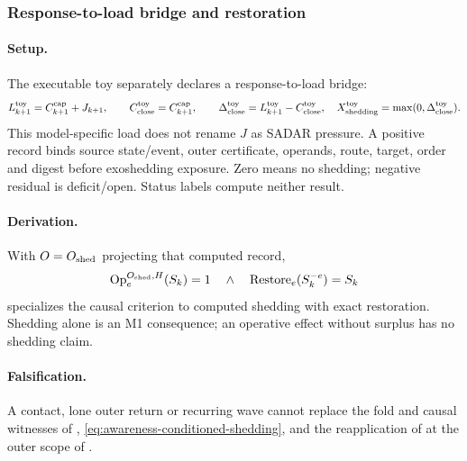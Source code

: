 \subsubsection{Response-to-load bridge and restoration}
\paragraph{Setup.}
The executable toy separately declares a response-to-load bridge:
\begin{equation}
 L^{\rm toy}_{k+1}=C^{\rm cap}_{k+1}+J_{k+1},\qquad
 C_{\rm close}^{\rm toy}=C^{\rm cap}_{k+1},\qquad
 \Delta_{\rm close}^{\rm toy}=L^{\rm toy}_{k+1}-C_{\rm close}^{\rm toy},
 \quad X_{\rm shedding}^{\rm toy}=\max(0,\Delta_{\rm close}^{\rm toy}).
 \label{eq:awareness-shedding-bridge}
\end{equation}
This model-specific load does not rename \(J\) as SADAR pressure. A positive
record binds source state/event, outer certificate, operands, route, target,
order and digest before exoshedding exposure. Zero means no shedding; negative
residual is deficit/open. Status labels compute neither result.

\paragraph{Derivation.}

With \(O=O_{\rm shed}\) projecting that computed record,
\begin{equation}
 \operatorname{Op}^{O_{\rm shed},H}_e(S_k)=1
 \quad\land\quad
 \operatorname{Restore}_e(S_k^{-e})=S_k
 \label{eq:awareness-conditioned-shedding}
\end{equation}
specializes the causal criterion to computed shedding with exact restoration.
Shedding alone is an M1 consequence; an operative effect without surplus has
no shedding claim.

\paragraph{Falsification.}
A contact, lone outer return or recurring wave cannot replace the fold and
causal witnesses of ,
\eqref{eq:awareness-conditioned-shedding}, and the reapplication of
 at the outer scope of
.



